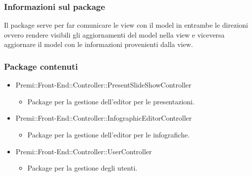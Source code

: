 \subsubsection*{Informazioni sul package}

	Il package serve per far comunicare le view con il model in entrambe le direzioni ovvero rendere visibili gli aggiornamenti del model nella view e viceversa aggiornare il model con le informazioni provenienti dalla view.
	\subsubsection*{Package contenuti}
		\begin{itemize}
		 \item Premi::Front-End::Controller::PresentSlideShowController
		 \begin{itemize}
		    \item Package per la gestione dell'editor per le presentazioni.
		 \end{itemize}
		 \item Premi::Front-End::Controller::InfographicEditorController
		 \begin{itemize}
		    \item Package per la gestione dell'editor per le infografiche.
		 \end{itemize}
		 \item Premi::Front-End::Controller::UserController
		 \begin{itemize}
		    \item Package per la gestione degli utenti.
		 \end{itemize}
		\end{itemize}
